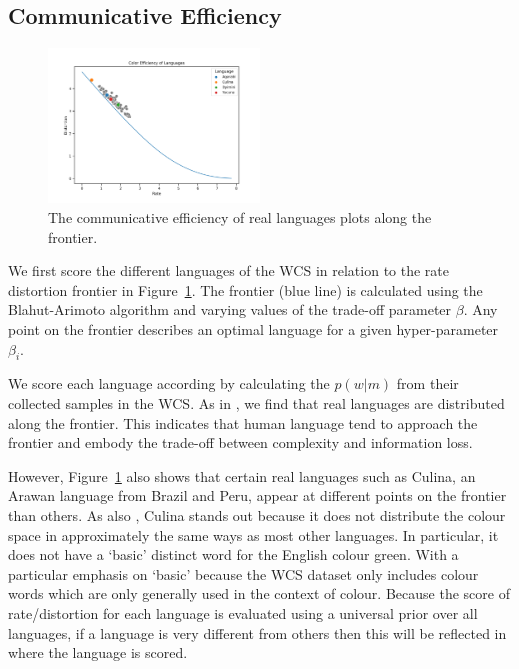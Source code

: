 \documentclass[11pt]{article}
\begin{document}
\subsection{Communicative Efficiency}

\begin{figure}
    \centering
    \includegraphics[width=0.5\textwidth]{docs/final_report_for_course/graphs/color_efficiency.png}
    \caption{The communicative efficiency of real languages plots along the frontier.}
    \label{fig:communicative_efficiency}
\end{figure}

We first score the different languages of the WCS in relation to the rate distortion frontier in Figure~\ref{fig:communicative_efficiency}.
The frontier (blue line) is calculated using the Blahut-Arimoto algorithm and varying values of the trade-off parameter $\beta$.
Any point on the frontier describes an optimal language for a given hyper-parameter $\beta_i$.

We score each language according by calculating the $p(w|m)$ from their collected samples in the WCS.
As in \citet{zaslavsky2018efficient}, we find that real languages are distributed along the frontier.
This indicates that human language tend to approach the frontier and embody the trade-off between complexity and information loss.

However, Figure~\ref{fig:communicative_efficiency} also shows that certain real languages such as Culina, an Arawan language from Brazil and Peru, appear at different points on the frontier than others.
As \citet{zaslavsky2018efficient} also , Culina stands out because it does not distribute the colour space in approximately the same ways as most other languages.
In particular, it does not have a `basic' distinct word for the English colour green.
With a particular emphasis on `basic' because the WCS dataset only includes colour words which are only generally used in the context of colour.
Because the score of rate/distortion for each language is evaluated using a universal prior over all languages, if a language is very different from others then this will be reflected in where the language is scored. 
\end{document}
